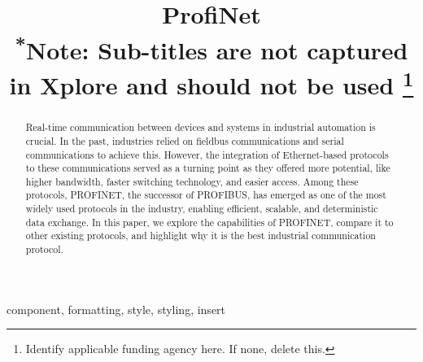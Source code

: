 \documentclass[conference]{IEEEtran}
\begin{document}
\title{ProfiNet\\
{\footnotesize \textsuperscript{*}Note: Sub-titles are not captured in Xplore and
should not be used}
\thanks{Identify applicable funding agency here. If none, delete this.}
}

\author{
\and
{}
\and
{}
}

\maketitle

\begin{abstract}
Real-time communication between devices and systems in industrial automation is crucial. In the past, industries relied on fieldbus communications and serial communications to achieve this. However, the integration of Ethernet-based protocols to these communications served as a turning point as they offered more potential, like higher bandwidth, faster switching technology, and easier access. Among these protocols, PROFINET, the successor of PROFIBUS, has emerged as one of the most widely used protocols in the industry, enabling efficient, scalable, and deterministic data exchange. In this paper, we explore the capabilities of PROFINET, compare it to other existing protocols, and highlight why it is the best industrial communication protocol.

\end{abstract}

\begin{IEEEkeywords}
component, formatting, style, styling, insert
\end{IEEEkeywords}
\end{document}
